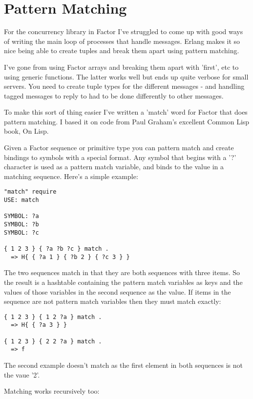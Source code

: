 \chapter{Pattern Matching}\label{patternmatching}

For the concurrency library in Factor I've struggled to come up with
good ways of writing the main loop of processes that handle
messages. Erlang makes it so nice being able to create tuples and
break them apart using pattern matching.

I've gone from using Factor arrays and breaking them apart with
'first', etc to using generic functions. The latter works well but
ends up quite verbose for small servers. You need to create tuple
types for the different messages - and handling tagged messages to
reply to had to be done differently to other messages.

To make this sort of thing easier I've written a 'match' word for
Factor that does pattern matching. I based it on code from Paul
Graham's excellent Common Lisp book, On Lisp.

Given a Factor sequence or primitive type you can pattern match and
create bindings to symbols with a special format. Any symbol that
begins with a '?' character is used as a pattern match variable, and
binds to the value in a matching sequence. Here's a simple example:

\begin{verbatim}
"match" require
USE: match

SYMBOL: ?a
SYMBOL: ?b
SYMBOL: ?c

{ 1 2 3 } { ?a ?b ?c } match . 
  => H{ { ?a 1 } { ?b 2 } { ?c 3 } }
\end{verbatim}


The two sequences match in that they are both sequences with three
items. So the result is a hashtable containing the pattern match
variables as keys and the values of those variables in the second
sequence as the value. If items in the sequence are not pattern match
variables then they must match exactly:

\begin{verbatim}
{ 1 2 3 } { 1 2 ?a } match .
  => H{ { ?a 3 } }

{ 1 2 3 } { 2 2 ?a } match .
  => f
\end{verbatim}


The second example doesn't match as the first element in both
sequences is not the vaue '2'.

Matching works recursively too:

